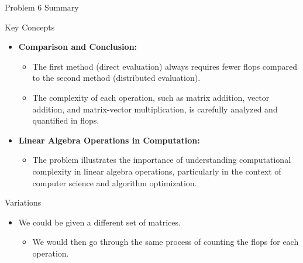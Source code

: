 \begin{summary}{Problem 6 Summary}
\begin{statement}{Key Concepts}
\begin{itemize}
\begin{itemize}
            \end{itemize}
            \item \textbf{Comparison and Conclusion:}
            \begin{itemize}
                \item The first method (direct evaluation) always requires fewer flops compared to the second method (distributed evaluation).
                \item The complexity of each operation, such as matrix addition, vector addition, and matrix-vector multiplication, is carefully analyzed and quantified in flops.
            \end{itemize}
            \item \textbf{Linear Algebra Operations in Computation:}
            \begin{itemize}
                \item The problem illustrates the importance of understanding computational complexity in linear algebra operations, particularly in the context of computer science and algorithm optimization.
            \end{itemize}
        \end{itemize}
    \end{statement}
    \begin{statement}{Variations}
        \begin{itemize}
            \item We could be given a different set of matrices.
            \begin{itemize}
                \item We would then go through the same process of counting the flops for each operation.
            \end{itemize}
        \end{itemize}
    \end{statement}
\end{summary}
